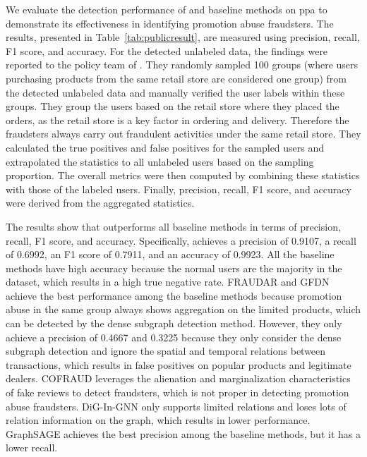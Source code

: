 We evaluate the detection performance of \toolname and baseline methods on \ac{ppa} to demonstrate its effectiveness in identifying promotion abuse fraudsters. The results, presented in Table~\ref{tab:publicresult}, are measured using precision, recall, F1 score, and accuracy. For the detected unlabeled data, the findings were reported to the policy team of \Company. They randomly sampled 100 groups (where users purchasing products from the same retail store are considered one group) from the detected unlabeled data and manually verified the user labels within these groups. They group the users based on the retail store where they placed the orders, as the retail store is a key factor in ordering and delivery. Therefore the fraudsters always carry out fraudulent activities under the same retail store. 
They calculated the true positives and false positives for the sampled users and extrapolated the statistics to all unlabeled users based on the sampling proportion. The overall metrics were then computed by combining these statistics with those of the labeled users. Finally, precision, recall, F1 score, and accuracy were derived from the aggregated statistics.

The results show that \toolname outperforms all baseline methods in terms of precision, recall, F1 score, and accuracy. Specifically, \toolname achieves a precision of 0.9107, a recall of 0.6992, an F1 score of 0.7911, and an accuracy of 0.9923. 
All the baseline methods have high accuracy because the normal users are the majority in the dataset, which results in a high true negative rate.
FRAUDAR and GFDN achieve the best performance among the baseline methods because promotion abuse in the same group always shows aggregation on the limited products, which can be detected by the dense subgraph detection method. However, they only achieve a precision of 0.4667 and 0.3225 because they only consider the dense subgraph detection and ignore the spatial and temporal relations between transactions, which results in false positives on popular products and legitimate dealers. COFRAUD leverages the alienation and marginalization characteristics of fake reviews to detect fraudsters, which is not proper in detecting promotion abuse fraudsters. DiG-In-GNN only supports limited relations and loses lots of relation information on the graph, which results in lower performance. GraphSAGE achieves the best precision among the baseline methods, but it has a lower recall. 

